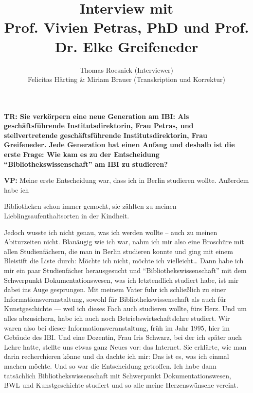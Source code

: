 \documentclass[a4paper,
fontsize=11pt,
oneside,
numbers=noperiodatend,
parskip=half-,
bibliography=totoc,
final
]{scrartcl}
\title{\LARGE{Interview mit \\ Prof. Vivien Petras, PhD und Prof. Dr. Elke Greifeneder}}%
\author{Thomas Roesnick (Interviewer) \\ Felicitas Härting \& Miriam Brauer (Transkription und Korrektur)} %
\date{}
\begin{document}
\maketitle
\thispagestyle{fancyplain} 


\textbf{TR: Sie verkörpern eine neue Generation am IBI: Als
geschäftsführende Institutsdirektorin, Frau Petras, und stellvertretende
geschäftsführende Institutsdirektorin, Frau Greifeneder. Jede Generation
hat einen Anfang und deshalb ist die erste Frage: Wie kam es zu der
Entscheidung \enquote{Bibliothekswissenschaft} am IBI zu studieren?}

\textbf{VP:} Meine erste Entscheidung war, dass ich in Berlin studieren
wollte. Außerdem habe ich

Bibliotheken schon immer gemocht, sie zählten zu meinen
Lieblingsaufenthaltsorten in der Kindheit.

Jedoch wusste ich nicht genau, was ich werden wollte -- auch zu meinen
Abiturzeiten nicht. Blauäugig wie ich war, nahm ich mir also eine
Broschüre mit allen Studienfächern, die man in Berlin studieren konnte
und ging mit einem Bleistift die Liste durch: Möchte ich nicht, möchte
ich vielleicht\ldots{} Dann habe ich mir ein paar Studienfächer
herausgesucht und \enquote{Bibliothekswissenschaft} mit dem Schwerpunkt
Dokumentationswesen, was ich letztendlich studiert habe, ist mir dabei
ins Auge gesprungen. Mit meinem Vater fuhr ich schließlich zu einer
Informationsveranstaltung, sowohl für Bibliothekswissenschaft als auch
für Kunstgeschichte --- weil ich dieses Fach auch studieren wollte, fürs
Herz. Und um alles abzusichern, habe ich auch noch
Betriebswirtschaftslehre studiert. Wir waren also bei dieser
Informationsveranstaltung, früh im Jahr 1995, hier im Gebäude des IBI.
Und eine Dozentin, Frau Iris Schwarz, bei der ich später auch Lehre
hatte, stellte uns etwas ganz Neues vor: das Internet. Sie erklärte, wie
man darin recherchieren könne und da dachte ich mir: Das ist es, was ich
einmal machen möchte. Und so war die Entscheidung getroffen. Ich habe
dann tatsächlich Bibliothekswissenschaft mit Schwerpunkt
Dokumentationswesen, BWL und Kunstgeschichte studiert und so alle meine
Herzenswünsche vereint.
\end{document}
